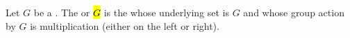 \begin{definition} \label{definition:trivial_torsor_principal_homogeneous_space_of_a_group}
    Let $G$ be a . 
    The  or  \hl{$G$} is the  whose underlying set is $G$ and whose group action by $G$ is multiplication (either on the left or right).
\end{definition}